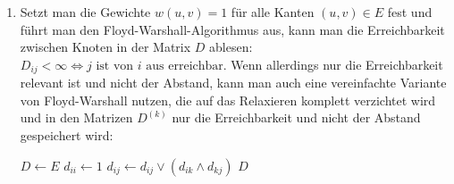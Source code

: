 \documentclass[11pt,a4paper]{article}
\begin{document}
\begin{loesung}
\begin{enumerate}
\begin{proof}
\begin{description}
                $d_{ij}$ ist trivialerweise unverändert, da es ja gerade erst gesetzt wird.
                $d_{ik}$ und $d_{kj}$ sind auch unverändert, da wir im aktuellen Durchlauf $k$ als Zwischenknoten betrachten. 
                Der Zwischenknoten $k$ hat nur dann Einfluss auf kürzeste Wege, die bei $k$ starten oder enden, wenn $k$ auf einem negativen Zyklus liegt.
                Dies haben wir aber per Definition bei Floyd-Warshall ausgeschlossen.
            \end{description}
            Nach dem Prinzip der Induktion ist $D$ nach dem $k$-ten Schleifendurchlauf für jedes $k$ identisch zu $D^{(k)}$.
        \end{proof}
        Dass der Algorithmus korrekt funktioniert, folgt sofort aus der Behauptung.
        \item 
        Setzt man die Gewichte $w(u, v) = 1$ für alle Kanten $(u, v) \in E$ fest und führt man den Floyd-Warshall-Algorithmus aus, kann man die Erreichbarkeit zwischen Knoten in der Matrix $D$ ablesen: $D_{ij} < \infty \Leftrightarrow \text{$j$ ist von $i$ aus erreichbar}$.
        Wenn allerdings nur die Erreichbarkeit relevant ist und nicht der Abstand, kann man auch eine vereinfachte Variante von Floyd-Warshall nutzen, die auf das Relaxieren komplett verzichtet wird und in den Matrizen $D^{(k)}$ nur die Erreichbarkeit und nicht der Abstand gespeichert wird:
        \begin{algorithmic}[1]
                \State $D \gets E$
                    \State $d_{ii} \gets 1$ 
                \EndFor
                            \State $d_{ij} \gets d_{ij} \vee (d_{ik} \wedge d_{kj})$
                        \EndFor
                    \EndFor
                \EndFor
                \State \Return $D$
            \EndProcedure
        \end{algorithmic}
    \end{enumerate}
\end{loesung}
\end{document}
